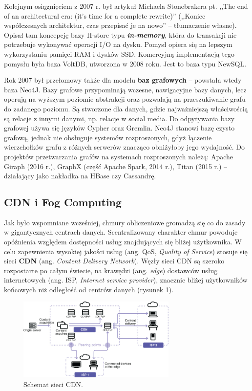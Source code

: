 \documentclass[12pt,a4paper,twoside,titlepage,openright]{book}
\begin{document}
Kolejnym osiągnięciem z 2007 r. był artykuł Michaela Stonebrakera pt. ,,The end of an architectural era: (it's time for a complete rewrite)'' (,,Koniec współczesnych architektur, czas przepisać je na nowo'' -- tłumaczenie własne). Opisał tam koncepcję bazy H-store typu \textit{\textbf{in-memory}}, która do transakcji nie potrzebuje wykonywać operacji I/O na dysku. Pomysł opiera się na lepszym wykorzystaniu pamięci RAM i dysków SSD. Komercyjną implementacją tego pomysłu była baza VoltDB, utworzona w 2008 roku. Jest to baza typu NewSQL.

Rok 2007 był przełomowy także dla modelu \textbf{baz grafowych} -- powstała wtedy baza Neo4J. Bazy grafowe przypominają wczesne, nawigacyjne bazy danych, lecz operują na wyższym poziomie abstrakcji oraz pozwalają na przeszukiwanie grafu do zadanego poziomu. Są stworzone dla danych, gdzie najważniejszą właściwością są relacje z innymi danymi, np. relacje w social media. Do odpytywania bazy grafowej używa się języków Cypher oraz Gremlin. Neo4J stanowi bazę czysto grafową, jednak nie obsługuje systemów rozproszonych, gdyż łączenie wierzchołków grafu z różnych serwerów znacząco obniżyłoby jego wydajność. Do projektów przetwarzania grafów na systemach rozproszonych należą: Apache Giraph (2016 r.), GraphX (część Apache Spark, 2014 r.), Titan (2015 r.) -- działający jako nakładka na HBase czy Cassandrę.


\subsection{CDN i Fog Computing} \label{section:fog}

Jak było wspomniane wcześniej, chmury obliczeniowe gromadzą się co do zasady w gigantycznych centrach danych. Scentralizowany charakter chmur powoduje opóźnienia względem dostępności usług znajdujących się bliżej użytkownika. W celu zapewnienia wysokiej jakości usług (ang. QoS, \textit{Quality of Service}) stosuje się sieci \textbf{CDN} (ang. \textit{Content Delivery Network}). Węzły sieci CDN są szeroko rozpostarte po całym świecie, na krawędzi (ang. \textit{edge}) dostawców usług internetowych (ang. ISP, \textit{Internet service provider}), znacznie bliżej użytkowników końcowych niż odległość od centrów danych (rysunek \ref{fig:cdn-schemat}). \cite{cdn}

\begin{figure}[h]
	\centering
			\includegraphics[width=0.7\textwidth]{cdn-schemat.jpg}
		\caption{Schemat sieci CDN. \cite{cdn}}
		\label{fig:cdn-schemat}
\end{figure}
\end{document}
